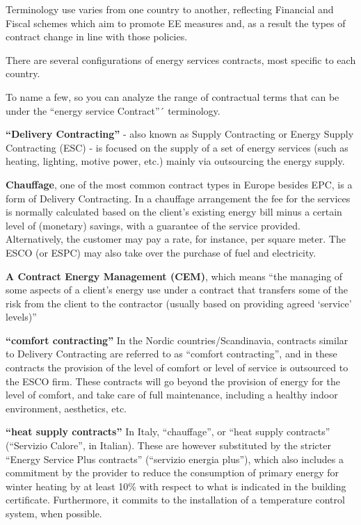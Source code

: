 \documentclass[]{book}
\theoremstyle{definition}
\theoremstyle{definition}
\theoremstyle{definition}
\theoremstyle{remark}
\begin{document}
Terminology use varies from one country to another, reflecting Financial
and Fiscal schemes which aim to promote EE measures and, as a result the
types of contract change in line with those policies.

There are several configurations of energy services contracts, most
specific to each country.

To name a few, so you can analyze the range of contractual terms that
can be under the ``energy service Contract''´ terminology.

\textbf{``Delivery Contracting''} - also known as Supply Contracting or
Energy Supply Contracting (ESC) - is focused on the supply of a set of
energy services (such as heating, lighting, motive power, etc.) mainly
via outsourcing the energy supply.

\textbf{Chauffage}, one of the most common contract types in Europe
besides EPC, is a form of Delivery Contracting. In a chauffage
arrangement the fee for the services is normally calculated based on the
client's existing energy bill minus a certain level of (monetary)
savings, with a guarantee of the service provided. Alternatively, the
customer may pay a rate, for instance, per square meter. The ESCO (or
ESPC) may also take over the purchase of fuel and electricity.

\textbf{A Contract Energy Management (CEM)}, which means ``the managing
of some aspects of a client's energy use under a contract that transfers
some of the risk from the client to the contractor (usually based on
providing agreed `service' levels)''

\textbf{``comfort contracting''} In the Nordic countries/Scandinavia,
contracts similar to Delivery Contracting are referred to as ``comfort
contracting'', and in these contracts the provision of the level of
comfort or level of service is outsourced to the ESCO firm. These
contracts will go beyond the provision of energy for the level of
comfort, and take care of full maintenance, including a healthy indoor
environment, aesthetics, etc.

\textbf{``heat supply contracts''} In Italy, ``chauffage'', or ``heat
supply contracts'' (``Servizio Calore'', in Italian). These are however
substituted by the stricter ``Energy Service Plus contracts''
(``servizio energia plus''), which also includes a commitment by the
provider to reduce the consumption of primary energy for winter heating
by at least 10\% with respect to what is indicated in the building
certificate. Furthermore, it commits to the installation of a
temperature control system, when possible.
\end{document}
